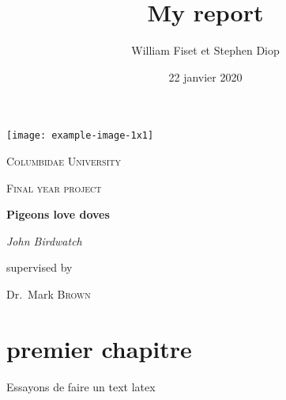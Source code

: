 \documentclass[11pt]{article}
\begin{document}
\title{My report}

\author{William Fiset et Stephen Diop}

\date{22 janvier 2020}
\begin{titlepage}
	\centering
	\texttt{[image: example-image-1x1]}\par\vspace{1cm}
	{\scshape\LARGE Columbidae University \par}
	\vspace{1cm}
	{\scshape\Large Final year project\par}
	\vspace{1.5cm}
	{\huge\bfseries Pigeons love doves\par}
	\vspace{2cm}
	{\Large\itshape John Birdwatch\par}
	\vfill
	supervised by\par
	Dr.~Mark \textsc{Brown}

	\vfill
\end{titlepage}

\section{premier chapitre}

Essayons de faire un text latex
\end{document}
